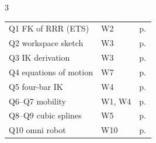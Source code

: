 \begin{multicols}{3}
\begin{tabular}{@{}lll@{}}
Q1 FK of RRR (ETS) & W2 & p.\,\pageref{r:fk}\\
Q2 workspace sketch & W3 & p.\,\pageref{r:ws}\\
Q3 IK derivation & W3 & p.\,\pageref{r:ik}\\
Q4 equations of motion & W7 & p.\,\pageref{r:lag}\\
Q5 four-bar IK & W4 & p.\,\pageref{r:fourbar}\\
Q6–Q7 mobility & W1, W4 & p.\,\pageref{r:gk}\\
Q8–Q9 cubic splines & W5 & p.\,\pageref{r:cubic}\\
Q10 omni robot & W10 & p.\,\pageref{r:wheel}\\
\end{tabular}
\end{multicols}
